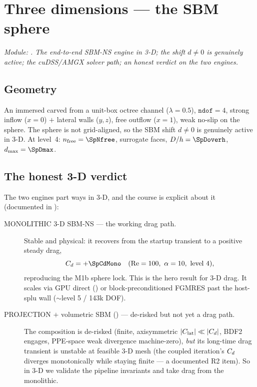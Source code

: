 \chapter{Three dimensions --- the SBM sphere}
\label{ch:c5}

\emph{Module: . The end-to-end SBM-NS engine in
3-D; the shift $d\neq0$ is genuinely active; the cuDSS/AMGX solver path; an
honest verdict on the two engines.}

\section{Geometry}
An immersed  carved from a
unit-box octree channel ($\lambda=0.5$), $\texttt{ndof}=4$, strong inflow
($x=0$) $+$ lateral walls ($y,z$), free outflow ($x=1$), weak no-slip on the
sphere. The sphere is not grid-aligned, so the SBM shift $d\neq0$ is
genuinely active in 3-D. At level~4: $n_{\text{free}}=\SpNfree$,
\SpFaces{} surrogate faces, $D/h=\SpDoverh$, $d_{\max}=\SpDmax$.

\section{The honest 3-D verdict}
The two engines part ways in 3-D, and the course is explicit about it
(documented in ):
\begin{description}
\item[MONOLITHIC 3-D SBM-NS --- the working drag path.] Stable and physical:
  it recovers from the startup transient to a positive steady drag,
  \[
  \Cd = +\SpCdMono\quad(\Rey=100,\ \alpha=10,\ \text{level }4),
  \]
  reproducing the M1b sphere lock. This is the hero result for 3-D drag. It
  scales via GPU direct () or block-preconditioned
  FGMRES past the host-splu wall (${\sim}$level 5 / 143k DOF).
\item[PROJECTION $+$ volumetric SBM () --- de-risked
  but not yet a drag path.] The composition is de-risked (finite,
  axisymmetric $|C_{\text{lat}}|\ll|C_d|$, BDF2 engages, PPE-space weak
  divergence machine-zero), \emph{but} its long-time drag transient is
  unstable at feasible 3-D mesh (the coupled iteration's $C_d$ diverges
  monotonically while staying finite --- a documented R2 item). So in 3-D we
  validate the pipeline invariants and take drag from the monolithic.
\end{description}

